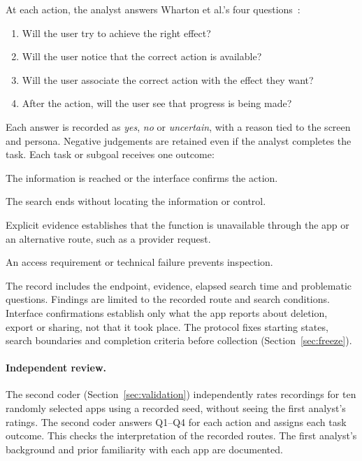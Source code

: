 At each action, the analyst answers Wharton et al.'s four
questions~\parencite[Table~5.1, p.~106]{wharton1994cognitive}:
\begin{enumerate}[label=\textbf{Q\arabic*},leftmargin=2.4em,itemsep=0pt,topsep=3pt]
  \item Will the user try to achieve the right effect?
  \item Will the user notice that the correct action is available?
  \item Will the user associate the correct action with the effect they want?
  \item After the action, will the user see that progress is being made?
\end{enumerate}
Each answer is recorded as \emph{yes}, \emph{no} or \emph{uncertain}, with a reason tied to the
screen and persona. Negative judgements are retained even if the analyst completes the task.
Each task or subgoal receives one outcome:
\begin{description}[leftmargin=1.5em,itemsep=1pt,topsep=3pt,labelindent=0pt,font=\normalfont\bfseries]
  \item[Completed.] The information is reached or the interface confirms the action.
  \item[Information not found.] The search ends without locating the information or control.
  \item[Task unsupported.] Explicit evidence establishes that the function is unavailable
    through the app or an alternative route, such as a provider request.
  \item[Access barrier.] An access requirement or technical failure prevents inspection.
\end{description}
The record includes the endpoint, evidence, elapsed search time and problematic questions.
Findings are limited to the recorded route and search conditions. Interface confirmations
establish only what the app reports about deletion, export or sharing, not that it took place.
The protocol fixes starting states, search boundaries and completion criteria before collection
(Section~\ref{sec:freeze}).

\paragraph{Independent review.} The second coder (Section~\ref{sec:validation}) independently
rates recordings for ten randomly selected apps using a recorded seed, without seeing the first
analyst's ratings. The second coder answers Q1--Q4 for each action and assigns each task
outcome. This checks the interpretation of the recorded routes. The first analyst's background
and prior familiarity with each app are documented.

